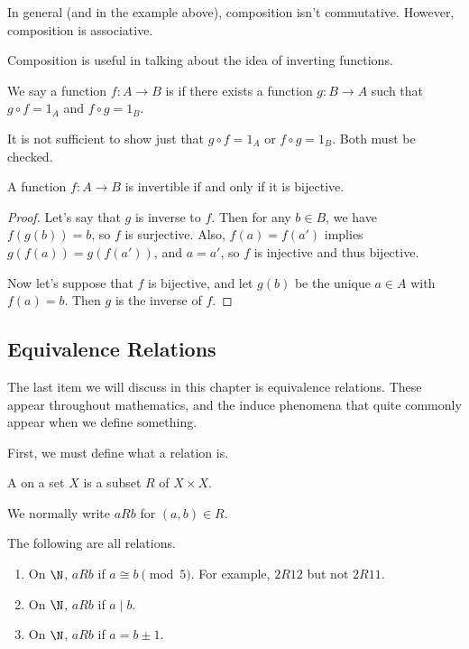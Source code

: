 In general (and in the example above), composition isn't commutative. However, composition is associative.

Composition is useful in talking about the idea of inverting functions.

\begin{definition}
	We say a function $f: A \rightarrow B$ is  if there exists a function $g: B \rightarrow A$ such that $g \circ f = 1_A$ and $f \circ g = 1_B$.
\end{definition}

\begin{remark}
	It is not sufficient to show just that $g \circ f = 1_A$ or $f \circ g = 1_B$. Both must be checked.
\end{remark}

\begin{proposition}
	A function $f : A \rightarrow B$ is invertible if and only if it is bijective.
\end{proposition}
\begin{proof}
	Let's say that $g$ is inverse to $f$. Then for any $b \in B$, we have $f(g(b)) = b$, so $f$ is surjective. Also, $f(a) = f(a')$ implies $g(f(a)) = g(f(a'))$, and $a = a'$, so $f$ is injective and thus bijective.

	Now let's suppose that $f$ is bijective, and let $g(b)$ be the unique $a \in A$ with $f(a) = b$. Then $g$ is the inverse of $f$.
\end{proof}

\subsection{Equivalence Relations}

The last item we will discuss in this chapter is equivalence relations. These appear throughout mathematics, and the induce phenomena that quite commonly appear when we define something. 

First, we must define what a relation is.

\begin{definition}[Relation]
	A  on a set $X$ is a subset $R$ of $X \times X$.
\end{definition}
We normally write $a R b$ for $(a, b) \in R$.

\begin{example}
	The following are all relations.
	\begin{enumerate}[label=(\roman*)]
		\item On $\N$, $a R b$ if $a \cong b \pmod{5}$. For example, $2 R 12$ but not $2 R 11$.
		\item On $\N$, $aR b$ if $a \mid b$.
		\item On $\N$, $aRb$ if $a = b \pm 1$.
	\end{enumerate}
\end{example}

